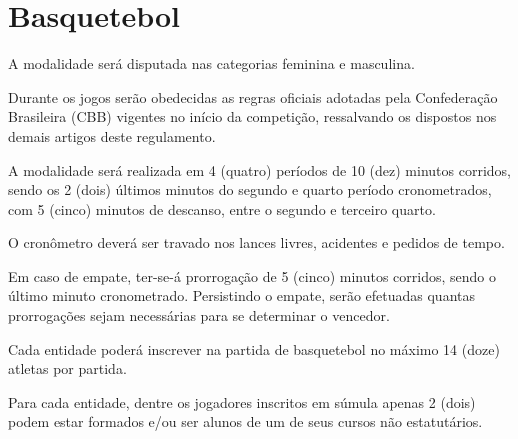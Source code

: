 {\let\clearpage\relax \chapter{Basquetebol}}

\begin{article}
	A modalidade será disputada nas categorias feminina e masculina.
\end{article}

\begin{article}
	Durante os jogos serão obedecidas as regras oficiais adotadas pela Confederação Brasileira (CBB) vigentes no início da competição, ressalvando os dispostos nos demais artigos deste regulamento.
\end{article}

\begin{article}
	A modalidade será realizada em 4 (quatro) períodos de 10 (dez) minutos corridos, sendo os 2 (dois) últimos minutos do segundo e quarto período cronometrados, com 5 (cinco) minutos de descanso, entre o segundo e terceiro quarto.

	\begin{xparagraph}
		O cronômetro deverá ser travado nos lances livres, acidentes e pedidos de tempo.
	\end{xparagraph}

	\begin{xparagraph}
		Em caso de empate, ter-se-á prorrogação de 5 (cinco) minutos corridos, sendo o último minuto cronometrado. Persistindo o empate, serão efetuadas quantas prorrogações sejam necessárias para se determinar o vencedor.
	\end{xparagraph}
\end{article}

\begin{article}
	Cada entidade poderá inscrever na partida de basquetebol no máximo 14 (doze) atletas por partida.
\end{article}

\begin{article}
	Para cada entidade, dentre os jogadores inscritos em súmula apenas 2 (dois) podem estar formados e/ou ser alunos de um de seus cursos não estatutários.
\end{article}
